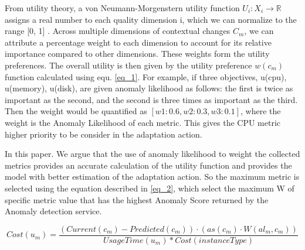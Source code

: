 \documentclass{ieeeaccess}
\begin{document}
 
From utility theory, a von Neumann-Morgenstern utility function $U_{i} : X_{i} \rightarrow \mathbb{R}$ assigns a real number to each quality dimension i, which we can normalize to the range [0, 1] \cite{fishburn1979two}. Across multiple dimensions of contextual changes $C_{m}$, we can attribute a percentage weight to each dimension to account for its relative importance compared to other dimensions. These weights form the utility preferences. The overall utility is then given by the utility preference $w(c_{m})$ function calculated using equ. \ref{eq_1}. For example, if three objectives, u(cpu), u(memory), u(disk), are given anomaly likelihood as follows: the first is twice as important as the second, and the second is three times as important as the third. Then the weight would be quantified as $[w1 : 0.6, w2 : 0.3, w3 : 0.1]$, where the weight is the Anomaly Likelihood of each metric. This gives the CPU metric higher priority to be consider in the adaptation action.
 

In this paper. We argue that the use of anomaly likelihood to weight the collected metrics provides an accurate calculation of the utility function and provides the model with better estimation of the adaptation action. So the maximum metric is selected using the equation described in \ref{eq_2}, which select the maximum W of specific metric value that has the highest Anomaly Score returned by the Anomaly detection service. 

\begin{equation}
\label{eq_3}
Cost(u_{m}) = \frac{(Current(c_{m}) - Predicted(c_{m}))\cdot (as(c_{m}) \cdot W(al_{m}, c_{m}))}{UsageTime(u_{m}) * Cost(instanceType)}
\end{equation}
\end{document}
